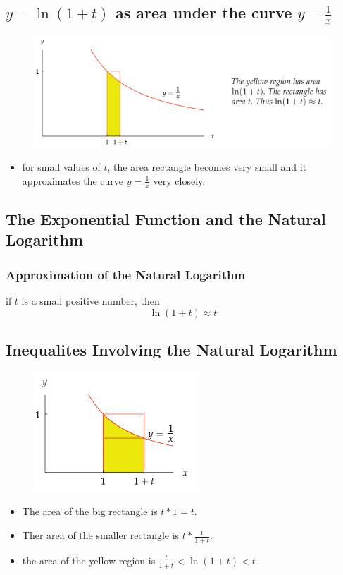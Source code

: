 \subsection{\(y = \ln(1+t)\) as area under the curve \(y = \frac{1}{x}\)}
\begin{figure}
  \centering
  \includegraphics[scale=0.5]{pics/e_6.png}
\end{figure}
\begin{itemize}
  \item for small values of \(t\), the area rectangle becomes very small and it approximates the curve \(y = \frac{1}{x}\) very closely.
\end{itemize}

\subsection{The Exponential Function and the Natural Logarithm}
\subsubsection{Approximation of the Natural Logarithm}
if \(t\) is a small positive number, then
\[ \ln(1+t) \approx t \]

\subsection{Inequalites Involving the Natural Logarithm}
\begin{figure}
  \centering
  \includegraphics[scale=0.5]{pics/e_7.png}
\end{figure}
\begin{itemize}
  \item The area of the big rectangle is \( t * 1 = t \).
  \item Ther area of the smaller rectangle is \( t * \frac{1}{1+t} \).
  \item the area of the yellow region is \(   \frac{t}{1+t}  < \ln(1+t) < t \)
\end{itemize}


